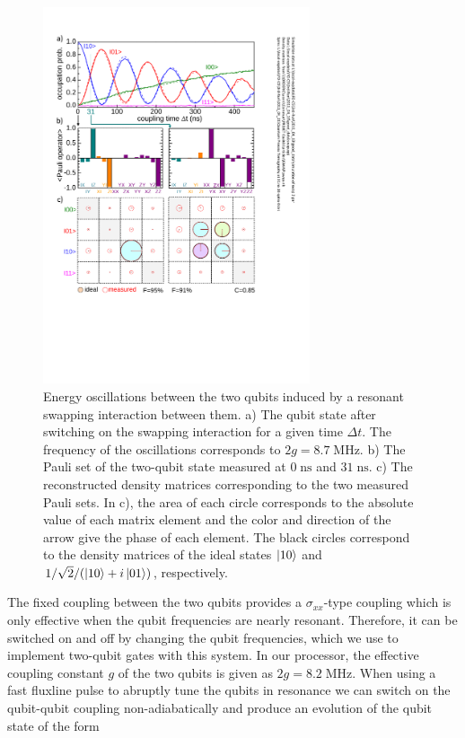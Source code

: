 \begin{figure}
	\centering
		\includegraphics[width=0.7\textwidth]{./material/papers/iswap/submission1/Dewes_Figure2}
	\caption[Generating entangled two-qubit states by swapping interaction]{Energy oscillations between the two qubits induced by a resonant swapping interaction between them. a) The qubit state after switching on the swapping interaction for a given time $\Delta t$. The frequency of the oscillations corresponds to $2g = 8.7 \; \mathrm{MHz}$. b) The Pauli set of the two-qubit state measured at $0\; \mathrm{ns}$ and $31\; \mathrm{ns}$. c) The reconstructed density matrices corresponding to the two measured Pauli sets. In c), the area of each circle corresponds to the absolute value of each matrix element and the color and direction of the arrow give the phase of each element. The black circles correspond to the density matrices of the ideal states $\left| 10 \right>$ and $1/\sqrt{2}/(\left| 10 \right>+i\left| 01 \right>)$, respectively.}
	\label{fig:swap_interaction_state_tomography}
\end{figure}

The fixed coupling between the two qubits provides a $\sigma_{xx}$-type coupling which is only effective when the qubit frequencies are nearly resonant. Therefore, it can be switched on and off by changing the qubit frequencies, which we use to implement two-qubit gates with this system. In our processor, the effective coupling constant $g$ of the two qubits is given as $2g = 8.2 \; \mathrm{MHz}$. When using a fast fluxline pulse to abruptly tune the qubits in resonance we can switch on the qubit-qubit coupling non-adiabatically and produce an evolution of the qubit state of the form

